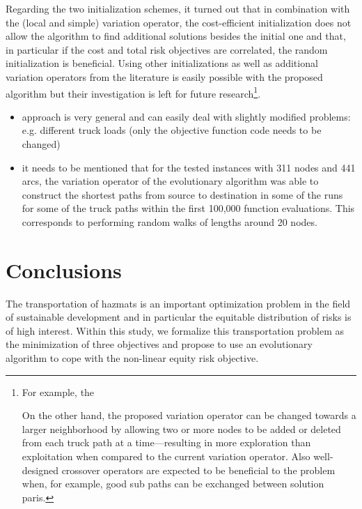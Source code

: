 \documentclass[preprint,12pt]{elsarticle}
\begin{document}
Regarding the two initialization schemes, it turned out that in combination with the (local and simple) variation operator, the cost-efficient initialization does not allow the algorithm to find additional solutions besides the initial one and that, in particular if the cost and total risk objectives are correlated, the random initialization is beneficial. Using other initializations as well as additional variation operators from the literature is easily possible with the proposed algorithm but their investigation is left for future research\footnote{For example, the 

On the other hand, the proposed variation operator can be changed towards a larger neighborhood by allowing two or more nodes to be added or deleted from each truck path at a time---resulting in more exploration than exploitation when compared to the current variation operator. Also well-designed crossover operators are expected to be beneficial to the problem when, for example, good sub paths can be exchanged between solution paris.
}.




\begin{itemize}
	
	\item approach is very general and can easily deal with slightly modified problems: e.g. different truck loads (only the objective function code needs to be changed)
	\item it needs to be mentioned that for the tested instances with 311 nodes and 441 arcs, the variation operator of the evolutionary algorithm was able to construct the shortest paths from source to destination in some of the runs for some of the truck paths within the first 100,000 function evaluations. This corresponds to performing random walks of lengths around 20 nodes.
\end{itemize}


\section{Conclusions} \label{S_FW}
The transportation of hazmats is an important optimization problem in the field of sustainable development and in particular the equitable distribution of risks is of high interest. Within this study, we formalize this transportation problem as the minimization of three objectives and propose to use an evolutionary algorithm to cope with the non-linear equity risk objective.
\end{document}

